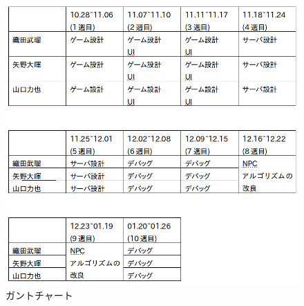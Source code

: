 \documentclass{jarticle}
\begin{document}
\begin{figure}[H]
\begin{center}
\includegraphics[width=\linewidth]{./zu/gunt.png}
\caption{ガントチャート}
\label{fig:gunt}
\end{center}
\end{figure}
\end{document}
